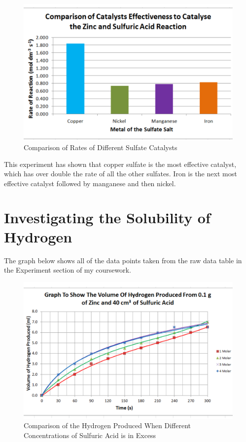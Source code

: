 \begin{figure}[H]
    \includegraphics[width=\textwidth]{./Analysis/Images/4DifferentCatalysts/Comparison.pdf}
    \caption{Comparison of Rates of Different Sulfate Catalysts} \label{fig:ComparisonCat}
\end{figure}

This experiment has shown that copper sulfate is the most effective catalyst, which has over double the rate of all the other sulfates. Iron is the next most effective catalyst followed by manganese and then nickel.


\section{Investigating the Solubility of Hydrogen} %

The graph below shows all of the data points taken from the raw data table in the Experiment section of my coursework. 

\begin{figure}[H]
    \includegraphics[width=\textwidth]{./Analysis/Images/Solubility.pdf}
    \caption{Comparison of the Hydrogen Produced When Different Concentrations of Sulfuric Acid is in Excess} \label{fig:ComparisonCat}
\end{figure}

